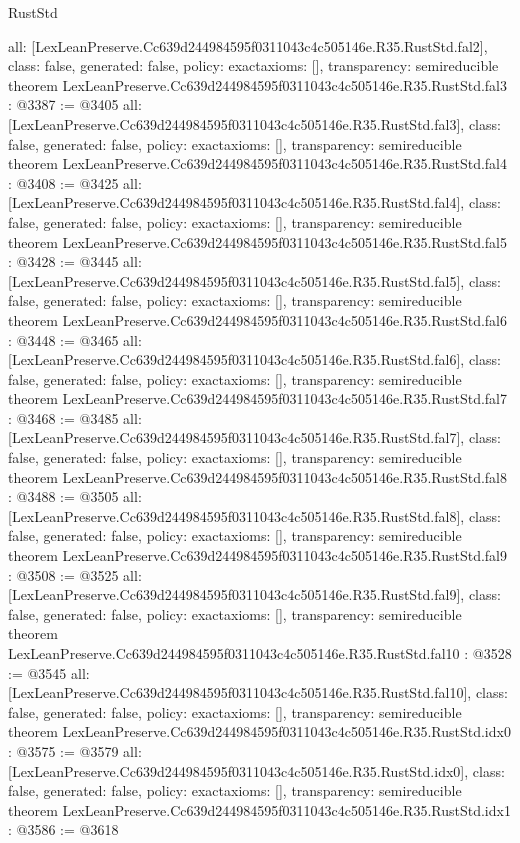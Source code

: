\begin{lexlean}{RustStd}
\begin{coremodule}
{  all: [LexLeanPreserve.Cc639d244984595f0311043c4c505146e.R35.RustStd.fal2],
  class: false,
  generated: false,
  policy: exact{axioms: []},
  transparency: semireducible
}
theorem LexLeanPreserve.Cc639d244984595f0311043c4c505146e.R35.RustStd.fal3 : @3387 := @3405 {
  all: [LexLeanPreserve.Cc639d244984595f0311043c4c505146e.R35.RustStd.fal3],
  class: false,
  generated: false,
  policy: exact{axioms: []},
  transparency: semireducible
}
theorem LexLeanPreserve.Cc639d244984595f0311043c4c505146e.R35.RustStd.fal4 : @3408 := @3425 {
  all: [LexLeanPreserve.Cc639d244984595f0311043c4c505146e.R35.RustStd.fal4],
  class: false,
  generated: false,
  policy: exact{axioms: []},
  transparency: semireducible
}
theorem LexLeanPreserve.Cc639d244984595f0311043c4c505146e.R35.RustStd.fal5 : @3428 := @3445 {
  all: [LexLeanPreserve.Cc639d244984595f0311043c4c505146e.R35.RustStd.fal5],
  class: false,
  generated: false,
  policy: exact{axioms: []},
  transparency: semireducible
}
theorem LexLeanPreserve.Cc639d244984595f0311043c4c505146e.R35.RustStd.fal6 : @3448 := @3465 {
  all: [LexLeanPreserve.Cc639d244984595f0311043c4c505146e.R35.RustStd.fal6],
  class: false,
  generated: false,
  policy: exact{axioms: []},
  transparency: semireducible
}
theorem LexLeanPreserve.Cc639d244984595f0311043c4c505146e.R35.RustStd.fal7 : @3468 := @3485 {
  all: [LexLeanPreserve.Cc639d244984595f0311043c4c505146e.R35.RustStd.fal7],
  class: false,
  generated: false,
  policy: exact{axioms: []},
  transparency: semireducible
}
theorem LexLeanPreserve.Cc639d244984595f0311043c4c505146e.R35.RustStd.fal8 : @3488 := @3505 {
  all: [LexLeanPreserve.Cc639d244984595f0311043c4c505146e.R35.RustStd.fal8],
  class: false,
  generated: false,
  policy: exact{axioms: []},
  transparency: semireducible
}
theorem LexLeanPreserve.Cc639d244984595f0311043c4c505146e.R35.RustStd.fal9 : @3508 := @3525 {
  all: [LexLeanPreserve.Cc639d244984595f0311043c4c505146e.R35.RustStd.fal9],
  class: false,
  generated: false,
  policy: exact{axioms: []},
  transparency: semireducible
}
theorem LexLeanPreserve.Cc639d244984595f0311043c4c505146e.R35.RustStd.fal10 : @3528 := @3545 {
  all: [LexLeanPreserve.Cc639d244984595f0311043c4c505146e.R35.RustStd.fal10],
  class: false,
  generated: false,
  policy: exact{axioms: []},
  transparency: semireducible
}
theorem LexLeanPreserve.Cc639d244984595f0311043c4c505146e.R35.RustStd.idx0 : @3575 := @3579 {
  all: [LexLeanPreserve.Cc639d244984595f0311043c4c505146e.R35.RustStd.idx0],
  class: false,
  generated: false,
  policy: exact{axioms: []},
  transparency: semireducible
}
theorem LexLeanPreserve.Cc639d244984595f0311043c4c505146e.R35.RustStd.idx1 : @3586 := @3618 {
}
\end{coremodule}
\end{lexlean}
